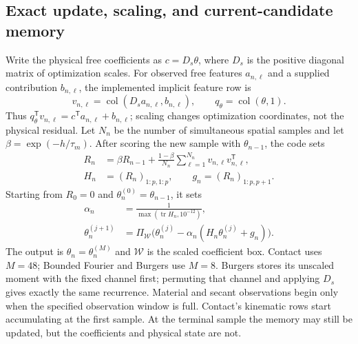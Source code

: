 \documentclass[journal]{IEEEtran}
\newcommand{\col}{\operatorname{col}}
\newcommand{\tr}{\operatorname{tr}}
\begin{document}
\subsection{Exact update, scaling, and current-candidate memory}
Write the physical free coefficients as $c=D_s\theta$, where $D_s$ is the
positive diagonal matrix of optimization scales. For observed free features
$a_{n,\ell}$ and a supplied contribution $b_{n,\ell}$, the implemented
implicit feature row is
\begin{equation}
 v_{n,\ell}=\col(D_sa_{n,\ell},b_{n,\ell}),\qquad
 q_\theta=\col(\theta,1).
 \label{eq:audit_channels}
\end{equation}
Thus $q_\theta^{\mathsf T}v_{n,\ell}=c^{\mathsf T}a_{n,\ell}+b_{n,\ell}$;
scaling changes optimization coordinates, not the physical residual.
Let $N_n$ be the number of simultaneous spatial samples and let
$\beta=\exp(-h/\tau_m)$. After scoring the new sample with $\theta_{n-1}$,
the code sets
\begin{align}
 R_n&=\beta R_{n-1}+\frac{1-\beta}{N_n}
       \sum_{\ell=1}^{N_n}v_{n,\ell}v_{n,\ell}^{\mathsf T},\\
 H_n&=(R_n)_{1:p,1:p},\qquad g_n=(R_n)_{1:p,p+1}.
\end{align}
Starting from $R_0=0$ and $\theta_n^{(0)}=\theta_{n-1}$, it sets
\begin{align}
 \alpha_n&=\frac{1}{\max(\tr H_n,10^{-12})},\\
 \theta_n^{(j+1)}&=\Pi_{\mathcal W}
 \bigl(\theta_n^{(j)}-\alpha_n(H_n\theta_n^{(j)}+g_n)\bigr).
 \label{eq:audit_exact_update}
\end{align}
The output is $\theta_n=\theta_n^{(M)}$ and $\mathcal W$ is the scaled
coefficient box. Contact uses $M=48$;
Bounded Fourier and Burgers use $M=8$. Burgers stores its unscaled moment with
the fixed channel first; permuting that channel and applying $D_s$ gives
exactly the same recurrence. Material and secant observations begin only
when the specified observation window is full. Contact's kinematic rows
start accumulating at the first sample. At the terminal sample the memory
may still be updated, but the coefficients and physical state are not.
\end{document}
